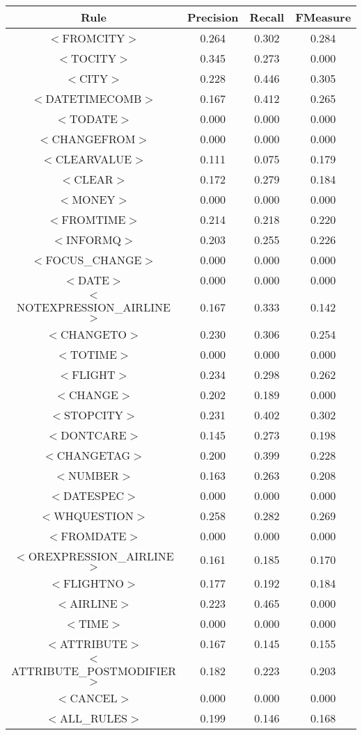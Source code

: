\documentclass[a4paper,10pt]{article}
\begin{document}
\pagebreak
{} \label{tab:title} 
\begin{center}
\begin{tabular}{|c||c|c|c|}
\hline
Rule&Precision&Recall&FMeasure\\
\hline
\hline
$<$FROMCITY$>$&0.264&0.302&0.284 \\
\hline$<$TOCITY$>$&0.345&0.273&0.000 \\
\hline$<$CITY$>$&0.228&0.446&0.305 \\
\hline$<$DATETIMECOMB$>$&0.167&0.412&0.265 \\
\hline$<$TODATE$>$&0.000&0.000&0.000 \\
\hline$<$CHANGEFROM$>$&0.000&0.000&0.000 \\
\hline$<$CLEARVALUE$>$&0.111&0.075&0.179 \\
\hline$<$CLEAR$>$&0.172&0.279&0.184 \\
\hline$<$MONEY$>$&0.000&0.000&0.000 \\
\hline$<$FROMTIME$>$&0.214&0.218&0.220 \\
\hline$<$INFORMQ$>$&0.203&0.255&0.226 \\
\hline$<$FOCUS\_CHANGE$>$&0.000&0.000&0.000 \\
\hline$<$DATE$>$&0.000&0.000&0.000 \\
\hline$<$NOTEXPRESSION\_AIRLINE$>$&0.167&0.333&0.142 \\
\hline$<$CHANGETO$>$&0.230&0.306&0.254 \\
\hline$<$TOTIME$>$&0.000&0.000&0.000 \\
\hline$<$FLIGHT$>$&0.234&0.298&0.262 \\
\hline$<$CHANGE$>$&0.202&0.189&0.000 \\
\hline$<$STOPCITY$>$&0.231&0.402&0.302 \\
\hline$<$DONTCARE$>$&0.145&0.273&0.198 \\
\hline$<$CHANGETAG$>$&0.200&0.399&0.228 \\
\hline$<$NUMBER$>$&0.163&0.263&0.208 \\
\hline$<$DATESPEC$>$&0.000&0.000&0.000 \\
\hline$<$WHQUESTION$>$&0.258&0.282&0.269 \\
\hline$<$FROMDATE$>$&0.000&0.000&0.000 \\
\hline$<$OREXPRESSION\_AIRLINE$>$&0.161&0.185&0.170 \\
\hline$<$FLIGHTNO$>$&0.177&0.192&0.184 \\
\hline$<$AIRLINE$>$&0.223&0.465&0.000 \\
\hline$<$TIME$>$&0.000&0.000&0.000 \\
\hline$<$ATTRIBUTE$>$&0.167&0.145&0.155 \\
\hline$<$ATTRIBUTE\_POSTMODIFIER$>$&0.182&0.223&0.203 \\
\hline$<$CANCEL$>$&0.000&0.000&0.000 \\
\hline
\hline
$<$ALL\_RULES$>$&0.199&0.146&0.168 \\
\hline
\end{tabular}
\end{center}
\pagebreak
\end{document}
